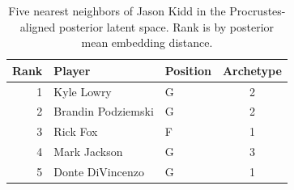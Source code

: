 \begin{table}[htbp]
  \centering\small
  \begin{tabular}{rllc}
    \toprule
    Rank & Player & Position & Archetype \\
    \midrule
    1 & Kyle Lowry & G & 2 \\
    2 & Brandin Podziemski & G & 2 \\
    3 & Rick Fox & F & 1 \\
    4 & Mark Jackson & G & 3 \\
    5 & Donte DiVincenzo & G & 1 \\
    \bottomrule
  \end{tabular}
  \caption{Five nearest neighbors of Jason Kidd in the Procrustes-aligned posterior latent space. Rank is by posterior mean embedding distance.}
  \label{tab:Jason_Kidd_neighbors}
\end{table}

